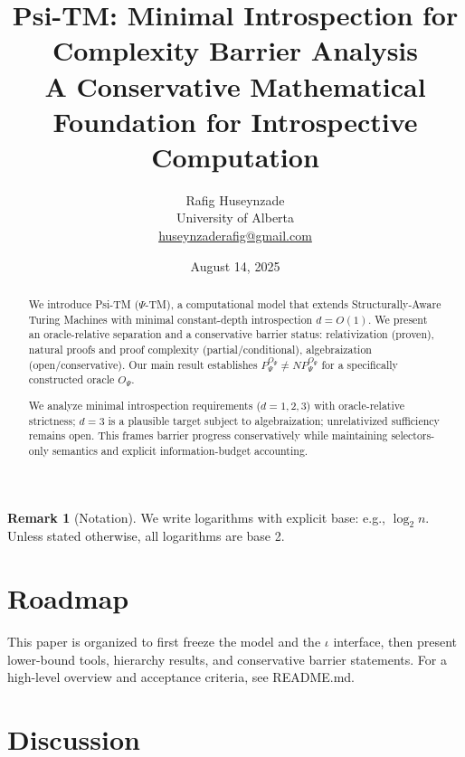 \documentclass[11pt]{article}
\title{Psi-TM: Minimal Introspection for Complexity Barrier Analysis\\
\large{A Conservative Mathematical Foundation for Introspective Computation}}
\author{Rafig Huseynzade\\
University of Alberta\\
\href{mailto:huseynzaderafig@gmail.com}{huseynzaderafig@gmail.com}}
\date{August 14, 2025}
\theoremstyle{plain}
\theoremstyle{definition}
\newtheorem{remark}[theorem]{Remark}
\begin{document}
\maketitle

\begin{abstract}
We introduce Psi-TM ($\Psi$-TM), a computational model that extends Structurally-Aware Turing Machines with minimal constant-depth introspection $d = O(1)$. We present an oracle-relative separation and a conservative barrier status: relativization (proven), natural proofs and proof complexity (partial/conditional), algebraization (open/conservative). Our main result establishes $P^{O_{\Psi}}_{\Psi} \neq NP^{O_{\Psi}}_{\Psi}$ for a specifically constructed oracle $O_{\Psi}$.

We analyze minimal introspection requirements ($d=1,2,3$) with oracle-relative strictness; $d=3$ is a plausible target subject to algebraization; unrelativized sufficiency remains open. This frames barrier progress conservatively while maintaining selectors-only semantics and explicit information-budget accounting.
\end{abstract}

\tableofcontents
\newpage

\begin{remark}[Notation]
We write logarithms with explicit base: e.g., $\log_{2} n$. Unless stated otherwise, all logarithms are base 2.
\end{remark}

\section{Roadmap}\label{sec:roadmap}
This paper is organized to first freeze the model and the $\iota$ interface, then present lower-bound tools, hierarchy results, and conservative barrier statements. For a high-level overview and acceptance criteria, see README.md.











\section{Discussion}\label{sec:discussion}
\end{document}
